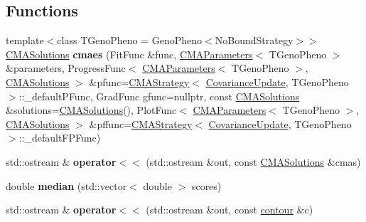 \subsection*{Functions}
\begin{DoxyCompactItemize}
\item 
\hypertarget{namespacelibcmaes_ac383e38be3f6670eddeec0918d385bd6}{{\footnotesize template$<$class T\-Geno\-Pheno  = Geno\-Pheno$<$\-No\-Bound\-Strategy$>$$>$ }\\\hyperlink{classlibcmaes_1_1CMASolutions}{C\-M\-A\-Solutions} {\bfseries cmaes} (Fit\-Func \&func, \hyperlink{classlibcmaes_1_1CMAParameters}{C\-M\-A\-Parameters}$<$ T\-Geno\-Pheno $>$ \&parameters, Progress\-Func$<$ \hyperlink{classlibcmaes_1_1CMAParameters}{C\-M\-A\-Parameters}$<$ T\-Geno\-Pheno $>$, \hyperlink{classlibcmaes_1_1CMASolutions}{C\-M\-A\-Solutions} $>$ \&pfunc=\hyperlink{classlibcmaes_1_1CMAStrategy}{C\-M\-A\-Strategy}$<$ \hyperlink{classlibcmaes_1_1CovarianceUpdate}{Covariance\-Update}, T\-Geno\-Pheno $>$\-::\-\_\-default\-P\-Func, Grad\-Func gfunc=nullptr, const \hyperlink{classlibcmaes_1_1CMASolutions}{C\-M\-A\-Solutions} \&solutions=\hyperlink{classlibcmaes_1_1CMASolutions}{C\-M\-A\-Solutions}(), Plot\-Func$<$ \hyperlink{classlibcmaes_1_1CMAParameters}{C\-M\-A\-Parameters}$<$ T\-Geno\-Pheno $>$, \hyperlink{classlibcmaes_1_1CMASolutions}{C\-M\-A\-Solutions} $>$ \&pffunc=\hyperlink{classlibcmaes_1_1CMAStrategy}{C\-M\-A\-Strategy}$<$ \hyperlink{classlibcmaes_1_1CovarianceUpdate}{Covariance\-Update}, T\-Geno\-Pheno $>$\-::\-\_\-default\-F\-P\-Func)}\label{namespacelibcmaes_ac383e38be3f6670eddeec0918d385bd6}

\item 
\hypertarget{namespacelibcmaes_a1922020e8d2259dd870ccd7893c3ea24}{std\-::ostream \& {\bfseries operator$<$$<$} (std\-::ostream \&out, const \hyperlink{classlibcmaes_1_1CMASolutions}{C\-M\-A\-Solutions} \&cmas)}\label{namespacelibcmaes_a1922020e8d2259dd870ccd7893c3ea24}

\item 
\hypertarget{namespacelibcmaes_a5b344b982de59b91af2f0c317f234f17}{double {\bfseries median} (std\-::vector$<$ double $>$ scores)}\label{namespacelibcmaes_a5b344b982de59b91af2f0c317f234f17}

\item 
\hypertarget{namespacelibcmaes_a0560798efe85d285c3b84dae8ebbab32}{std\-::ostream \& {\bfseries operator$<$$<$} (std\-::ostream \&out, const \hyperlink{classlibcmaes_1_1contour}{contour} \&c)}\label{namespacelibcmaes_a0560798efe85d285c3b84dae8ebbab32}


\end{DoxyCompactItemize}
